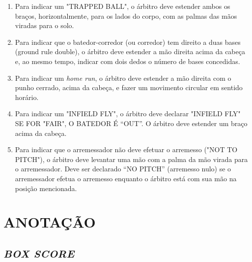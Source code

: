 \begin{multicols}{2}
\begin{enumerate}[label=\alph*)]
		\item  Para indicar um "TRAPPED BALL", o árbitro deve estender ambos os braços, horizontalmente, para os lados do corpo, com as palmas das mãos viradas para o solo.

		\item  Para indicar que o batedor-corredor (ou corredor) tem direito a duas bases (\gls{ground rule double}), o árbitro deve estender a mão direita acima da cabeça e, ao mesmo tempo, indicar com dois dedos o número de bases concedidas.

		\item  Para indicar um \textit{home run}, o árbitro deve estender a mão direita com o punho cerrado, acima da cabeça, e fazer um movimento circular em sentido horário.

		\item  Para indicar um "INFIELD FLY", o árbitro deve declarar "INFIELD FLY" SE FOR "FAIR", O BATEDOR É “OUT”. O árbitro deve estender um braço acima da cabeça.

		\item Para indicar que o arremessador não deve efetuar o arremesso ("NOT TO PITCH"), o árbitro deve levantar uma mão com a palma da mão virada para o arremessador. Deve ser declarado “NO PITCH” (arremesso nulo) se o arremessador efetua o arremesso enquanto o árbitro está com sua mão na posição mencionada.
	\end{enumerate}
\end{multicols}

\chapter{ANOTAÇÃO }

\section{\textit{BOX SCORE}}

